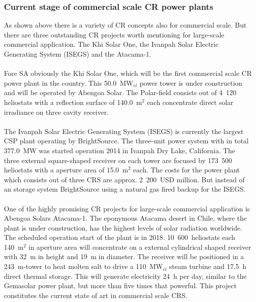 \documentclass[Master,MEE,english]{twbook}%
\begin{document}
\subsubsection{Current stage of commercial scale CR power plants}
As shown above there is a variety of CR concepts also for commercial scale. But there are three outstanding CR projects worth mentioning for large-scale commercial application. The Khi Solar One, the Ivanpah Solar Electric Generating System (ISEGS) and the Atacama-1.\\
\\
Fore SA obviously the Khi Solar One, which will be the first commercial scale CR power plant in the country. This 50.0~MW$_{el}$ power tower is under construction and will be operated by Abengoa Solar. The Polar-field consists out of 4~120 heliostats with a reflection surface of 140.0~m$^2$ each concentrate direct solar irradiance on three cavity receiver. \cite{NREL2014,Prof.Dinter2015}\\
\\
The Ivanpah Solar Electric Generating System (ISEGS) is currently the largest CSP plant operating by BrightSource. The three-unit power system with in total 377.0~MW was started operation 2014 in Ivanpah Dry Lake, California. The three external square-shaped receiver on each tower are focused by 173~500 heliostats with a aperture area of 15.0~m$^2$ each. The costs for the power plant which consists out of three CRS are approx. 2~200~USD million. But instead of an storage system BrightSource using a natural gas fired backup for the ISEGS. \cite{BrightSourceEnergy2014,NREL2014a}\\
\\
One of the highly promising CR projects for large-scale commercial application is Abengoa Solars Atacama-1. The eponymous Atacama desert in Chile, where the plant is under construction, has the highest levels of solar radiation worldwide. The scheduled operation start of the plant is in 2018. 10~600~heliostats each 140~m$^2$ in aperture area will concentrate on a external cylindrical shaped receiver with 32~m in height and 19~m in diameter. The receiver will be positioned in a 243~m-tower to heat molten salt to drive a 110~MW$_{el}$ steam turbine and 17.5~h direct thermal storage. This will generate electricity 24~h per day, similar to the Gemasolar power plant, but more than five times that powerful. This project constitutes the current state of art in commercial scale CRS. \cite{NREL2015b,AbengoaSolar2015a,AbengoaSolar2015}
\pagebreak
\end{document}
